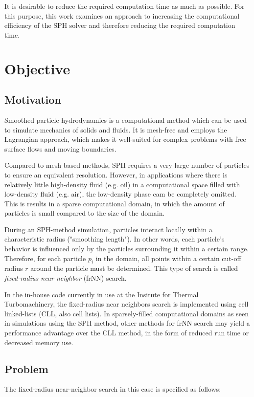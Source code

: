 It is desirable to reduce the required computation time as much as possible. For this purpose, this work examines an approach to increasing the computational efficiency of the SPH solver and therefore reducing the required computation time. 

\chapter{Objective}

\section{Motivation}
\label{SECTION:Motivation}
Smoothed-particle hydrodynamics is a computational method which can be used to simulate mechanics of solids and fluids.  It is mesh-free and employs the Lagrangian approach, which makes it well-suited for complex problems with free surface flows and moving boundaries.

Compared to mesh-based methods, SPH requires a very large number of particles to ensure an equivalent resolution.  However, in applications where there is relatively little high-density fluid (e.g.  oil) in a computational space filled with low-density fluid (e.g.  air), the low-density phase cam be completely omitted.  This is results in a sparse computational domain, in which the amount of particles is small compared to the size of the domain.

During an SPH-method simulation, particles interact locally within a characteristic radius ("smoothing length").  In other words, each particle's behavior is influenced only by the particles surrounding it within a certain range.  Therefore, for each particle $p_i$ in the domain, all points within a certain cut-off radius $r$ around the particle must be determined.  This type of search is called {\itshape fixed-radius near neighbor} (frNN) search.

In the in-house code currently in use at the Insitute for Thermal Turbomachinery, the fixed-radius near neighbors search is implemented using cell linked-lists (CLL, also cell lists). In sparsely-filled computational domains as seen in simulations using the SPH method, other methods for frNN search may yield a performance advantage over the CLL method, in the form of reduced run time or decreased memory use.

\section{Problem}
\label{SECTION:Problem}
The fixed-radius near-neighbor search in this case is specified as follows:

